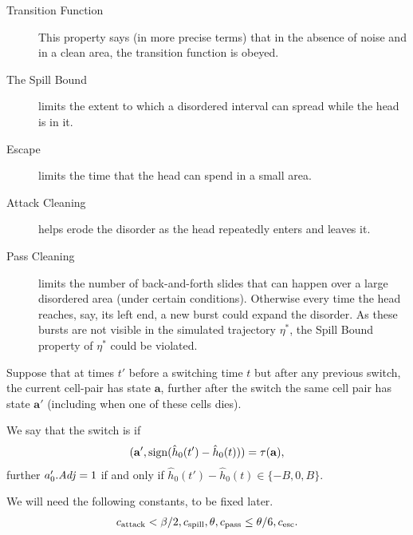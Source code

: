 \documentclass[11pt]{memoir}
\theoremstyle{definition} %
\renewcommand{\le}{\leq}
\renewcommand{\ge}{\geq}
\renewcommand{\vek}[1]{\mathbf{#1}}
\newcommand{\fld}[1]{\ensuremath{\textit{#1\/}}}
\def\B{B}
\newcommand{\va}{\vek{a}}
\newcommand{\hc}{\hat h}
\newcommand{\Adj}{\fld{Adj}}
\newcommand{\cns}[1]{c_{\textrm{\upshape #1}}}
\newcommand{\CAtt}{\cns{attack}}
\newcommand{\CPass}{\cns{pass}}
\newcommand{\CEsc}{\cns{esc}}
\newcommand{\CSpill}{\cns{spill}}
\begin{document}
\begin{description}
\item[Transition Function] This property says (in more precise terms)
that in the absence of noise and in a clean area, the
transition function is obeyed.

\item[The Spill Bound] limits the extent to which a disordered interval can spread while
the head is in it.

\item[Escape] limits the time that the head can spend in a small area.

\item[Attack Cleaning] helps erode the disorder as the head repeatedly enters and leaves it.

\item[Pass Cleaning] limits the number of back-and-forth slides that can happen over a
large disordered area (under certain conditions).
Otherwise every time the head reaches, say, its left end,
a new burst could expand the disorder.
As these bursts are not visible in the simulated trajectory \( \eta^{*} \),
the Spill Bound property of \( \eta^{*} \) could be violated.

\end{description}

\begin{definition}
Suppose that at times \( t' \) before a switching time \( t \) but after 
any previous switch, the current cell-pair has state \( \va \),
further after the switch the same cell pair has state \( \va' \)
(including when one of these cells dies).

We say that the switch is  if
\begin{align*}
 (\va',\sign(\hc_{0}(t')-\hc_{0}(t))) =  \tau(\va),
 \end{align*}
further \( a'_{0}.\Adj=1 \) if and only if \( \hc_{0}(t')-\hc_{0}(t)\in\{-B,0,B\} \).
\end{definition}

We will need the following constants, to be fixed later.
\begin{align}\label{eq:cns.traj}
  \CAtt<\beta/2,
  \CSpill,
  \theta,
  \CPass\le\theta/6,
  \CEsc.
 \end{align}
\end{document}
